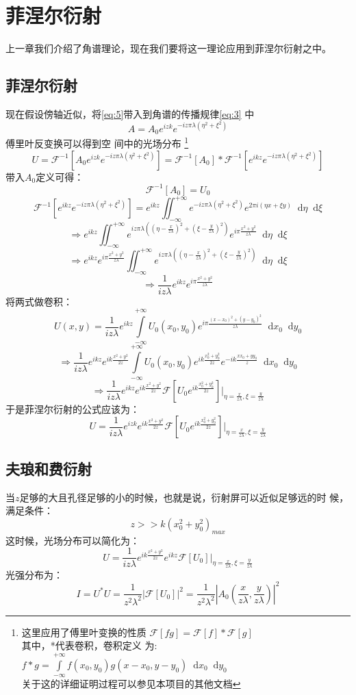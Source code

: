 \documentclass{article}
\newcommand*{\dif}{\mathop{}\!\mathrm{d}}
\begin{document}
\section{菲涅尔衍射}
上一章我们介绍了角谱理论，现在我们要将这一理论应用到菲涅尔衍射之中。
\subsection{菲涅尔衍射}

现在假设傍轴近似，将\ref{eq:5}带入到角谱的传播规律\ref{eq:3}
中\[A=A_0e^{izk}e^{-iz\pi\lambda(\eta^2+\xi^2)}\]傅里叶反变换可以得到空
间中的光场分布
\footnote{
  这里应用了傅里叶变换的性质
  $\mathscr{F}[fg]=\mathscr{F}[f]*\mathscr{F}[g]$\\
  其中，*代表卷积，卷积定义
  为:$f*g=\int\limits_{-\infty}^{+\infty}f(x_0,y_0)g(x-x_0,y-y_0)\dif
  x_0\dif y_0$
  \\关于这的详细证明过程可以参见本项目的其他文档}
\[U=\mathscr{F}^{-1}[A_0e^{izk}e^{-iz\pi\lambda(\eta^{2}+\xi^2)}]=\mathscr{F}^{-1}[A_0]*\mathscr{F}^{-1}[e^{ikz}e^{-iz\pi\lambda(\eta^2+\xi^2)}]\]
带入$A_0$定义可得：
\[\mathscr{F}^{-1}[A_0]=U_0\]
\[
  \mathscr{F}^{-1}[e^{ikz}e^{-iz\pi\lambda(\eta^2+\xi^2)}]=e^{ikz}\iint_{-\infty}^{+\infty}e^{-iz\pi\lambda(\eta^2+\xi^2)}e^{2\pi
    i(\eta x+\xi y)}\dif\eta\dif\xi\]
\[\Rightarrow
  e^{ikz}\iint_{-\infty}^{+\infty}e^{iz\pi\lambda((\eta-\frac{x}{z\lambda})^2+(\xi-\frac{y}{z\lambda})^2)}e^{i\pi
    \frac{x^2+y^2}{z\lambda}}\dif\eta\dif\xi\]
\[\Rightarrow e^{ikz}e^{i\pi
    \frac{x^2+y^2}{z\lambda}}\iint_{-\infty}^{+\infty}e^{iz\pi\lambda((\eta-\frac{x}{z\lambda})^2+(\xi-\frac{y}{z\lambda})^2)}\dif\eta\dif\xi\]
\[\Rightarrow \frac{1}{iz\lambda}e^{ikz}e^{i\pi \frac{x^2+y^2}{z\lambda}}\]
将两式做卷积：
\[U(x,y)=\frac{1}{iz\lambda}e^{ikz}\int\limits_{-\infty}^{+\infty}U_0(x_0,y_0)e^{i\pi
    \frac{(x-x_0)^2+(y-y_0)^2}{z\lambda}}\dif x_0\dif y_0\]
\[\Rightarrow \frac{1}{iz\lambda}e^{ikz}e^{ik
    \frac{x^2+y^2}{2z}}\int\limits_{-\infty}^{+\infty}U_0(x_0,y_0)e^{ik
    \frac{x_0^2+y_0^2}{2z}}e^{-ik \frac{xx_0+yy_0}{z}}\dif x_0\dif
  y_0\]
\[\Rightarrow \frac{1}{iz\lambda}e^{ikz}e^{ik
    \frac{x^2+y^2}{2z}}\mathscr{F}[U_0e^{ik
    \frac{x_0^2+y_0^2}{2z}}]|_{\eta=\frac{x}{z\lambda},\xi=\frac{y}{z\lambda}}\]
于是菲涅尔衍射的公式应该为：
\begin{equation}
  \label{eq:6}
  U=\frac{1}{iz\lambda}e^{izk}e^{ik \frac{x^2+y^2}{2z}}\mathscr{F}[U_0e^{ik \frac{x_0^2+y_0^2}{2z}}]|_{\eta=\frac{x}{z\lambda},\xi=\frac{y}{z\lambda}}
\end{equation}
\subsection{夫琅和费衍射}
当$z$足够的大且孔径足够的小的时候，也就是说，衍射屏可以近似足够远的时
候，满足条件：
\[z>>k(x_0^2+y_0^2)_{max}\]
这时候，光场分布可以简化为：
\[U=\frac{1}{iz\lambda}e^{ik
    \frac{x^2+y^2}{2z}}e^{ikz}\mathscr{F}[U_0]|_{\eta=\frac{x}{z\lambda},\xi=\frac{y}{z\lambda}}\]
光强分布为：
\begin{equation}
  \label{eq:7}
  I=U^{*}U=\frac{1}{z^2\lambda^2}|\mathscr{F}[U_0]|^2=\frac{1}{z^2\lambda^2}|A_0(\frac{x}{z\lambda},\frac{y}{z\lambda})|^2
\end{equation}
\end{document}
